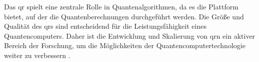 Das \ac{qr} spielt eine zentrale Rolle in Quantenalgorithmen, da es die Plattform bietet, auf der die Quantenberechnungen durchgeführt werden. Die Größe und Qualität des \ac{qr}s sind entscheidend für die Leistungsfähigkeit eines Quantencomputers. Daher ist die Entwicklung und Skalierung von \ac{qr}n ein aktiver Bereich der Forschung, um die Möglichkeiten der Quantencomputertechnologie weiter zu verbessern \cite{divincenzo_physical_2000}.

